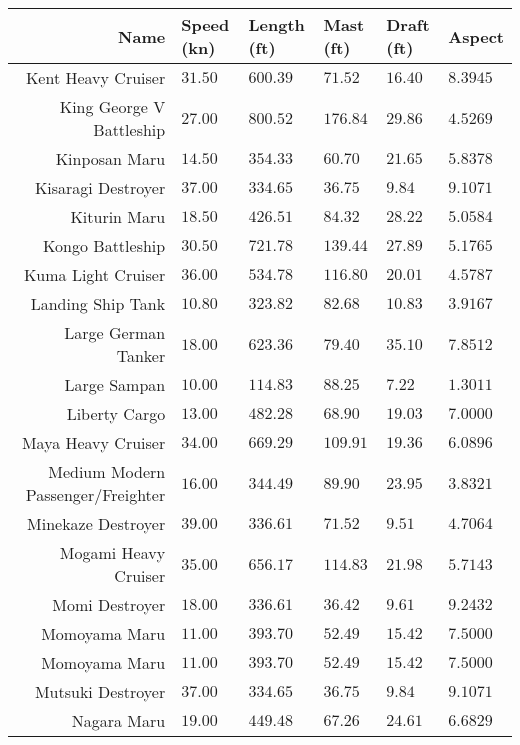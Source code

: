 \documentclass{article}
\begin{document}
\pagebreak
\begin{tabularx}{\textwidth}{|r|l|l|l|l|X|}
\hline
\textbf{Name} & \textbf{Speed (kn)} & \textbf{Length (ft)} & \textbf{Mast (ft)} & \textbf{Draft (ft)} & \textbf{Aspect}\\
\hline
Kent Heavy Cruiser & $31.50$ & $600.39$ & $71.52$ & $16.40$ & $8.3945$ \\
\hline
King George V Battleship & $27.00$ & $800.52$ & $176.84$ & $29.86$ & $4.5269$ \\
\hline
Kinposan Maru & $14.50$ & $354.33$ & $60.70$ & $21.65$ & $5.8378$ \\
\hline
Kisaragi Destroyer & $37.00$ & $334.65$ & $36.75$ & $9.84$ & $9.1071$ \\
\hline
Kiturin Maru & $18.50$ & $426.51$ & $84.32$ & $28.22$ & $5.0584$ \\
\hline
Kongo Battleship & $30.50$ & $721.78$ & $139.44$ & $27.89$ & $5.1765$ \\
\hline
Kuma Light Cruiser & $36.00$ & $534.78$ & $116.80$ & $20.01$ & $4.5787$ \\
\hline
Landing Ship Tank & $10.80$ & $323.82$ & $82.68$ & $10.83$ & $3.9167$ \\
\hline
Large German Tanker & $18.00$ & $623.36$ & $79.40$ & $35.10$ & $7.8512$ \\
\hline
Large Sampan & $10.00$ & $114.83$ & $88.25$ & $7.22$ & $1.3011$ \\
\hline
Liberty Cargo & $13.00$ & $482.28$ & $68.90$ & $19.03$ & $7.0000$ \\
\hline
Maya Heavy Cruiser & $34.00$ & $669.29$ & $109.91$ & $19.36$ & $6.0896$ \\
\hline
Medium Modern Passenger/Freighter & $16.00$ & $344.49$ & $89.90$ & $23.95$ & $3.8321$ \\
\hline
Minekaze Destroyer & $39.00$ & $336.61$ & $71.52$ & $9.51$ & $4.7064$ \\
\hline
Mogami Heavy Cruiser & $35.00$ & $656.17$ & $114.83$ & $21.98$ & $5.7143$ \\
\hline
Momi Destroyer & $18.00$ & $336.61$ & $36.42$ & $9.61$ & $9.2432$ \\
\hline
Momoyama Maru & $11.00$ & $393.70$ & $52.49$ & $15.42$ & $7.5000$ \\
\hline
Momoyama Maru & $11.00$ & $393.70$ & $52.49$ & $15.42$ & $7.5000$ \\
\hline
Mutsuki Destroyer & $37.00$ & $334.65$ & $36.75$ & $9.84$ & $9.1071$ \\
\hline
Nagara Maru & $19.00$ & $449.48$ & $67.26$ & $24.61$ & $6.6829$ \\

\end{tabularx}
\end{document}
